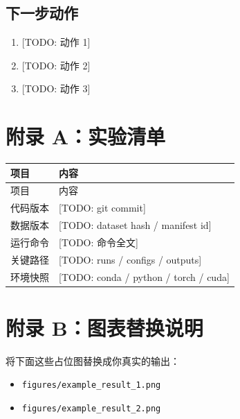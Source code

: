 \documentclass[UTF8,a4paper,11pt]{ctexart}
\newcommand{\TODO}[1]{\textcolor{red!70!black}{[TODO: #1]}}
\newcommand{\Code}[1]{\texttt{#1}}
\begin{document}
\subsection{下一步动作}
\begin{enumerate}
  \item \TODO{动作 1}
  \item \TODO{动作 2}
  \item \TODO{动作 3}
\end{enumerate}

\appendix

\section{附录 A：实验清单}

\begin{longtable}{p{} p{}}
\toprule
项目 & 内容 \\
\midrule
\endfirsthead
\toprule
项目 & 内容 \\
\midrule
\endhead
代码版本 & \TODO{git commit} \\
数据版本 & \TODO{dataset hash / manifest id} \\
运行命令 & \TODO{命令全文} \\
关键路径 & \TODO{runs / configs / outputs} \\
环境快照 & \TODO{conda / python / torch / cuda} \\
\bottomrule
\end{longtable}

\section{附录 B：图表替换说明}

将下面这些占位图替换成你真实的输出：
\begin{itemize}
  \item \Code{figures/example\_result\_1.png}
  \item \Code{figures/example\_result\_2.png}
\end{itemize}
\end{document}
